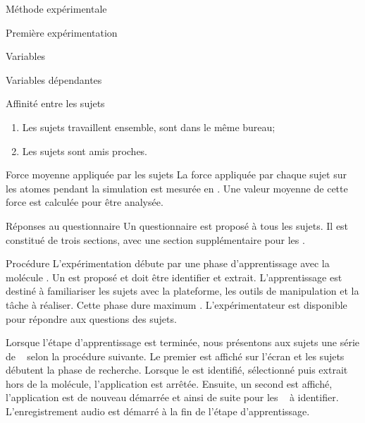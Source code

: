 \documentclass[myfrancais,ngerman,english,frenchb]{mythesis}
\begin{document}
\begin{mychapter}{Méthode expérimentale}
\begin{mysection}{Première expérimentation}
\begin{mysubsection}{Variables}
\begin{mysubsubsection}{Variables dépendantes}
\begin{myparagraph}{ Affinité entre les sujets}
\begin{enumerate}
							\item Les sujets travaillent ensemble, sont dans le même bureau;
							\item Les sujets sont amis proches.
						\end{enumerate}
					\end{myparagraph}
					\begin{myparagraph}{ Force moyenne appliquée par les sujets}
						La force appliquée par chaque sujet sur les atomes pendant la simulation est mesurée en .
						Une valeur moyenne de cette force est calculée pour être analysée.
					\end{myparagraph}
					\begin{myparagraph}{ Réponses au questionnaire}
						Un questionnaire est proposé à tous les sujets.
						Il est constitué de trois sections, avec une section supplémentaire pour les  .
					\end{myparagraph}
				\end{mysubsubsection}
			\end{mysubsection}
			\begin{mysubsection}{Procédure}
				L'expérimentation débute par une phase d'apprentissage avec la molécule \myTRPZIPPER.
				Un  est proposé et doit être identifier et extrait.
				L'apprentissage est destiné à familiariser les sujets avec la plateforme, les outils de manipulation et la tâche à réaliser.
				Cette phase dure maximum .
				L'expérimentateur est disponible pour répondre aux questions des sujets.

				Lorsque l'étape d'apprentissage est terminée, nous présentons aux sujets une série de ~ selon la procédure suivante.
				Le premier  est affiché sur l'écran \myLCD et les sujets débutent la phase de recherche.
				Lorsque le  est identifié, sélectionné puis extrait hors de la molécule, l'application est arrêtée.
				Ensuite, un second  est affiché, l'application est de nouveau démarrée et ainsi de suite pour les ~ à identifier.
				L'enregistrement audio est démarré à la fin de l'étape d'apprentissage.


\end{mysubsection}
\end{mysection}
\end{mychapter}
\end{document}
